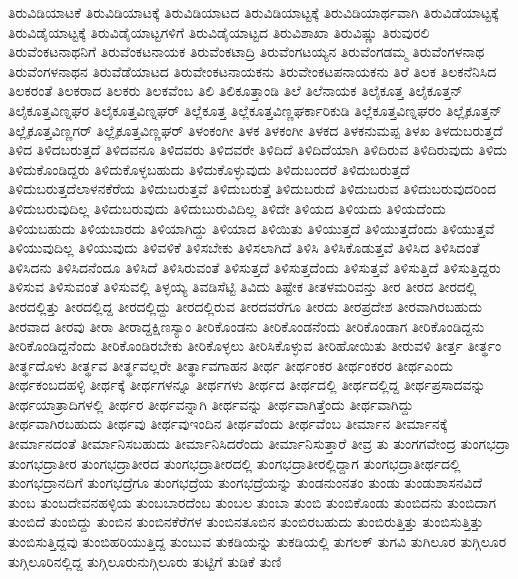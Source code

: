 {ತಿರುವಿಡಿಯಾಟಕೆ
ತಿರುವಿಡಿಯಾಟಕ್ಕೆ
ತಿರುವಿಡಿಯಾಟದ
ತಿರುವಿಡಿಯಾಟ್ಟಕ್ಕೆ
ತಿರುವಿಡಿಯಾರ್ಥವಾಗಿ
ತಿರುವಿಡೆಯಾಟ್ಟಕ್ಕೆ
ತಿರುವಿಡೈಯಾಟ್ಟಕ್ಕೆ
ತಿರುವಿಡೈಯಾಟ್ಟಗಳಿಗೆ
ತಿರುವಿಡೈಯಾಟ್ಟದ
ತಿರುವಿಶಾಖಾ
ತಿರುವಿಷ್ಣು
ತಿರುವುರಲಿ
ತಿರುವೆಂಕಟನಾಥನಿಗೆ
ತಿರುವೆಂಕಟನಾಯಕ
ತಿರುವೆಂಕಟಾದ್ರಿ
ತಿರುವೆಂಗಟಯ್ಯನ
ತಿರುವೆಂಗಡಮ್ಮ
ತಿರುವೆಂಗಳನಾಥ
ತಿರುವೆಂಗಳನಾಥನ
ತಿರುವೆಡೆಯಾಟದ
ತಿರುವೇಂಕಟನಾಯಕನು
ತಿರುವೇಂಕಟಪನಾಯಕನು
ತಿರೆ
ತಿಲಕ
ತಿಲಕನೆನಿಸಿದ
ತಿಲಕರಂತೆ
ತಿಲಕರಾದ
ತಿಲಕರು
ತಿಲಕವೆಂಬ
ತಿಲಿ
ತಿಲಿಕೂತ್ತಾಂಡಿ
ತಿಲೆ
ತಿಲೆನಾಯಕ
ತಿಲೈಕೂತ್ತ
ತಿಲೈಕೂತ್ತನ್
ತಿಲೈಕೂತ್ತವಿಣ್ನಘರ
ತಿಲೈಕೂತ್ತವಿಣ್ನಘರ್
ತಿಲ್ಲೆಕೂತ್ತ
ತಿಲ್ಲೆಕೂತ್ತವಿಣ್ಣಘರ್ಕಾರಿಕುಡಿ
ತಿಲ್ಲೆಕೂತ್ತವಿಣ್ನಘರಂ
ತಿಲ್ಲೈಕೂತ್ತನ್
ತಿಲ್ಲೈಕೂತ್ತವಿಣ್ಣಗರ್
ತಿಲ್ಲೈಕೂತ್ತವಿಣ್ಣಘರ್
ತಿಳಂಕಂಗೀ
ತಿಳಕ
ತಿಳಕಂಗೀ
ತಿಳಕದ
ತಿಳಕನುಮಪ್ಪ
ತಿಳಖ
ತಿಳದುಬರುತ್ತದೆ
ತಿಳಿದ
ತಿಳಿದಬರುತ್ತದೆ
ತಿಳಿದವನೂ
ತಿಳಿದವರು
ತಿಳಿದವರೇ
ತಿಳಿದಿದೆ
ತಿಳಿದಿದೆಯಾಗಿ
ತಿಳಿದಿರುವ
ತಿಳಿದಿರುವುದು
ತಿಳಿದು
ತಿಳಿದುಕೊಂಡಿದ್ದರು
ತಿಳಿದುಕೊಳ್ಳಬಹುದು
ತಿಳಿದುಕೊಳ್ಳುವುದು
ತಿಳಿದುಬಂದರೆ
ತಿಳಿದುಬರುತ್ತದೆ
ತಿಳಿದುಬರುತ್ತದೆಲಾಳನಕೆರೆಯ
ತಿಳಿದುಬರುತ್ತವೆ
ತಿಳಿದುಬರುತ್ತೆ
ತಿಳಿದುಬರುದೆ
ತಿಳಿದುಬರುವ
ತಿಳಿದುಬರುವುದರಿಂದ
ತಿಳಿದುಬರುವುದಿಲ್ಲ
ತಿಳಿದುಬರುವುದು
ತಿಳಿದುಬುರುವಿದಿಲ್ಲ
ತಿಳಿದೇ
ತಿಳಿಯದ
ತಿಳಿಯದು
ತಿಳಿಯದೆಂದು
ತಿಳಿಯಬಹುದು
ತಿಳಿಯಬಾರದು
ತಿಳಿಯಾಗಿದ್ದು
ತಿಳಿಯಾದ
ತಿಳಿಯಿತು
ತಿಳಿಯುತ್ತದೆ
ತಿಳಿಯುತ್ತದೆಂದು
ತಿಳಿಯುತ್ತವೆ
ತಿಳಿಯುವುದಿಲ್ಲ
ತಿಳಿಯುವುದು
ತಿಳಿವಳಿಕೆ
ತಿಳಿಸಬೇಕು
ತಿಳಿಸಲಾಗಿದೆ
ತಿಳಿಸಿ
ತಿಳಿಸಿಕೊಡುತ್ತವೆ
ತಿಳಿಸಿದ
ತಿಳಿಸಿದಂತೆ
ತಿಳಿಸಿದನು
ತಿಳಿಸಿದನೆಂದೂ
ತಿಳಿಸಿದೆ
ತಿಳಿಸಿರುವಂತೆ
ತಿಳಿಸುತ್ತದೆ
ತಿಳಿಸುತ್ತದೆಂದು
ತಿಳಿಸುತ್ತವೆ
ತಿಳಿಸುತ್ತಿದೆ
ತಿಳಿಸುತ್ತಿದ್ದರು
ತಿಳಿಸುವ
ತಿಳಿಸುವಂತೆ
ತಿಳಿಸುವಲ್ಲಿ
ತಿಳ್ಳಯ್ಯ
ತಿವಡಿಸೆಟ್ಟಿ
ತಿವಿದು
ತಿಷ್ಟೇಕ
ತೀತಳಮರಿವನ್ತು
ತೀರ
ತೀರದ
ತೀರದಲ್ಲಿ
ತೀರದಲ್ಲಿತ್ತು
ತೀರದಲ್ಲಿದ್ದ
ತೀರದಲ್ಲಿದ್ದು
ತೀರದಲ್ಲಿರುವ
ತೀರದವರೆಗೂ
ತೀರದು
ತೀರಪ್ರದೇಶ
ತೀರವಾಗಿರಬಹುದು
ತೀರವಾದ
ತೀರವು
ತೀರಾ
ತೀರಾದ್ದಕ್ಷಿಣಸ್ಯಾಂ
ತೀರಿಕೊಂಡನು
ತೀರಿಕೊಂಡನೆಂದು
ತೀರಿಕೊಂಡಾಗ
ತೀರಿಕೊಂಡಿದ್ದನು
ತೀರಿಕೊಂಡಿದ್ದನೆಂದು
ತೀರಿಕೊಂಡಿರಬೇಕು
ತೀರಿಕೊಳ್ಳಲು
ತೀರಿಸಿಕೊಳ್ಳುವ
ತೀರಿಹೋಯಿತು
ತೀರುವಳಿ
ತೀರ್ತ್ತ
ತೀರ್ತ್ಥಂ
ತೀರ್ತ್ಥದೊಳು
ತೀರ್ತ್ಥವ
ತೀರ್ತ್ಥವಲ್ಲರೇ
ತೀರ್ತ್ಥಾವಗಾಹನ
ತೀರ್ಥ
ತೀರ್ಥಂಕರ
ತೀರ್ಥಂಕರರ
ತೀರ್ಥಎಂದು
ತೀರ್ಥಕಂಬದಹಳ್ಳಿ
ತೀರ್ಥಕ್ಕೆ
ತೀರ್ಥಗಳನ್ನೂ
ತೀರ್ಥಗಳು
ತೀರ್ಥದ
ತೀರ್ಥದಲ್ಲಿ
ತೀರ್ಥದಲ್ಲಿದ್ದ
ತೀರ್ಥಪ್ರಸಾದವನ್ನು
ತೀರ್ಥಯಾತ್ರಾದಿಗಳಲ್ಲಿ
ತೀರ್ಥರ
ತೀರ್ಥವನ್ನಾಗಿ
ತೀರ್ಥವನ್ನು
ತೀರ್ಥವಾಗಿತ್ತೆಂದು
ತೀರ್ಥವಾಗಿದ್ದು
ತೀರ್ಥವಾಗಿರಬಹುದು
ತೀರ್ಥವು
ತೀರ್ಥವುಇಂದಿನ
ತೀರ್ಥವೆಂದು
ತೀರ್ಥವೆಂಬ
ತೀರ್ಮಾನ
ತೀರ್ಮಾನಕ್ಕೆ
ತೀರ್ಮಾನದಂತೆ
ತೀರ್ಮಾನಿಸಬಹುದು
ತೀರ್ಮಾನಿಸಿದರೆಂದು
ತೀರ್ಮಾನಿಸುತ್ತಾರೆ
ತೀವ್ರ
ತು
ತುಂಗಗವೇಂದ್ರ
ತುಂಗಭದ್ರಾ
ತುಂಗಭದ್ರಾತೀರ
ತುಂಗಭದ್ರಾತೀರದ
ತುಂಗಭದ್ರಾತೀರದಲ್ಲಿ
ತುಂಗಭದ್ರಾತೀರಲ್ಲಿದ್ದಾಗ
ತುಂಗಭದ್ರಾತೀರ್ಥದಲ್ಲಿ
ತುಂಗಭದ್ರಾನದಿಗೆ
ತುಂಗಭದ್ರೆಗೂ
ತುಂಗಭದ್ರೆಯ
ತುಂಗಭದ್ರೆಯನ್ನು
ತುಂಡನುಂನತಂ
ತುಂಡು
ತುಂಡುಶಾಸನವಿದೆ
ತುಂಬ
ತುಂಬದೇವನಹಳ್ಳಿಯ
ತುಂಬಬಾರದೆಂಬ
ತುಂಬಲ
ತುಂಬಾ
ತುಂಬಿ
ತುಂಬಿಕೊಂಡು
ತುಂಬಿದನು
ತುಂಬಿದಾಗ
ತುಂಬಿದೆ
ತುಂಬಿದ್ದು
ತುಂಬಿನ
ತುಂಬಿನಕೆರೆಗಳ
ತುಂಬಿನತೂಬಿನ
ತುಂಬಿರಬಹುದು
ತುಂಬಿರುತ್ತಿತ್ತು
ತುಂಬಿಸುತ್ತಿತ್ತು
ತುಂಬಿಸುತ್ತಿದ್ದವು
ತುಂಬಿಹರಿಯುತ್ತಿದ್ದ
ತುಂಬುವ
ತುಕಡಿಯನ್ನು
ತುಕಡಿಯಲ್ಲಿ
ತುಗಲಕ್
ತುಗವಿ
ತುಗಿಲೂರ
ತುಗ್ಗಿಲೂರ
ತುಗ್ಗಿಲೂರಿನಲ್ಲಿದ್ದ
ತುಗ್ಗಿಲೂರುನುಗ್ಗಿಲೂರು
ತುಟ್ಟಿಗೆ
ತುಡಿಕೆ
ತುಣಿ
}
